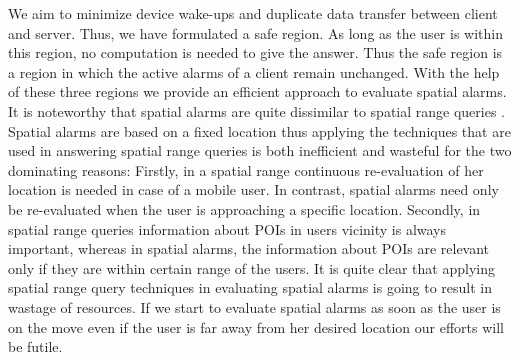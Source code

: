 We aim to minimize device wake-ups and duplicate data transfer between client and server. Thus, we have formulated a safe region. As long as the user is within this region, no computation is needed to give the answer. Thus the safe region is a region in which the active alarms of a client remain unchanged. With the help of these three regions we provide an efficient approach to evaluate spatial alarms. It is noteworthy that spatial alarms are quite dissimilar to spatial range queries \cite{roadalarm}. Spatial alarms are based on a fixed location thus applying the techniques that are used in answering spatial range queries is both inefficient and wasteful for the two dominating reasons: Firstly, in a spatial range continuous re-evaluation of her location is needed in case of a mobile user. In contrast, spatial alarms need only be re-evaluated when the user is approaching a specific location. Secondly, in spatial range queries information about POIs in users vicinity is always important, whereas in spatial alarms, the information about POIs are relevant only if they are within certain range of the users. It is quite clear that applying spatial range query techniques in evaluating spatial alarms is going to result in wastage of resources. If we start to evaluate spatial alarms as soon as the user is on the move even if the user is far away from her desired location our efforts will be futile. 
\vspace*{10pt}



